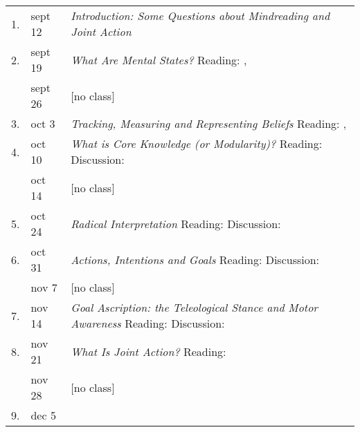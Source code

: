 \documentclass[12pt,\papersize]{extarticle}
\begin{document}
{\begin{table}[htbp]
\begin{center}
\begin{tabular*}{1\textwidth}{ l l m{} }
1. & sept 12  
	&  \textit{Introduction: Some Questions about Mindreading and Joint Action}
\\  2. & sept 19  
	& \textit{What Are Mental States?}
		\newline Reading: \citet[§§1.1--1.3, 3.1--3.4, 4.1]{Jeffrey:1983oe}, \citet[§1]{fitch:2009_singular}
\\ &   sept 26 & [no class]
\\ 3. & oct 3 
		& \textit{Tracking, Measuring and Representing Beliefs}
			\newline  Reading: \citet{matthews:1994_measure}, \citet{kovacs_social_2010}
\\  4. & oct 10 
	&  \textit{What is Core Knowledge (or Modularity)?}
		\newline Reading: \citet{Fodor:1983dg,Fodor:2000cj,Baillargeon:gx,Wellman:2001lz}
		\newline Discussion: {\citet{Sugden:2000mw}}
\\ & oct 14 & [no class]
\\ 5. & oct 24 
	& 	\textit{Radical Interpretation}
		\newline Reading: \citet{Davidson:1985qg,Davidson:1973jx,Davidson:1980xp,Davidson:1990du}
		\newline Discussion: \citet{matthews:1994_measure}
\\ 6. & oct 31 
	& \textit{Actions, Intentions and Goals}
		\newline Reading: \citet{Davidson:1971fz,Davidson:1978hy,Bratman:1985fk,bratman:2000_valuing} 
		\newline Discussion: \citet{Davidson:1973jx}
\\ & nov 7 & [no class]
\\ 7. & nov 14 
	& \textit{Goal Ascription: the Teleological Stance and Motor Awareness}
		\newline Reading: \citet{Millikan:1989cd,Millikan:1993_behaviour,Millikan:1993_green,Gergely:1995sq,Csibra:2003kp,Fogassi:2005nf}
		\newline Discussion: \citet{Bratman:1984jr}
\\ 8. & nov 21 
	&  \textit{What Is Joint Action?}
		\newline Reading: \citet{Bratman:1992mi,Bratman:1993je,ludwig_collective_2007,Searle:1990em}
\\ & nov 28 & [no class]
\\ 9. & dec 5 

\end{tabular*}
\end{center}
\end{table}}
\end{document}
